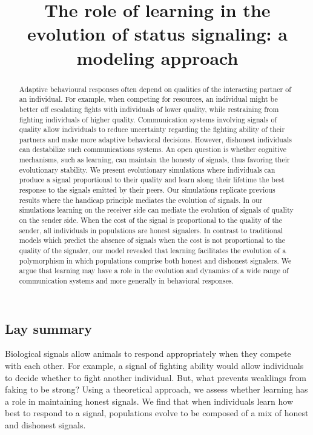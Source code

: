 \documentclass[
  12pt,
]{article}
\title{The role of learning in the evolution of status signaling: a
modeling approach}
\date{}
\begin{document}
\maketitle
\begin{flushleft}
\end{flushleft}
\begin{abstract}
Adaptive behavioural responses often depend on qualities of the
interacting partner of an individual. For example, when competing for
resources, an individual might be better off escalating fights with
individuals of lower quality, while restraining from fighting
individuals of higher quality. Communication systems involving signals
of quality allow individuals to reduce uncertainty regarding the
fighting ability of their partners and make more adaptive behavioral
decisions. However, dishonest individuals can destabilize such
communications systems. An open question is whether cognitive
mechanisms, such as learning, can maintain the honesty of signals, thus
favoring their evolutionary stability. We present evolutionary
simulations where individuals can produce a signal proportional to their
quality and learn along their lifetime the best response to the signals
emitted by their peers. Our simulations replicate previous results where
the handicap principle mediates the evolution of signals. In our
simulations learning on the receiver side can mediate the evolution of
signals of quality on the sender side. When the cost of the signal is
proportional to the quality of the sender, all individuals in
populations are honest signalers. In contrast to traditional models
which predict the absence of signals when the cost is not proportional
to the quality of the signaler, our model revealed that learning
facilitates the evolution of a polymorphism in which populations
comprise both honest and dishonest signalers. We argue that learning may
have a role in the evolution and dynamics of a wide range of
communication systems and more generally in behavioral responses.
\end{abstract}
\subsection*{Lay summary}
Biological signals allow animals to respond appropriately when they
compete with each other. For example, a signal of fighting ability would
allow individuals to decide whether to fight another individual. But,
what prevents weaklings from faking to be strong? Using a theoretical
approach, we assess whether learning has a role in maintaining honest
signals. We find that when individuals learn how best to respond to a
signal, populations evolve to be composed of a mix of honest and
dishonest signals.
\end{document}
